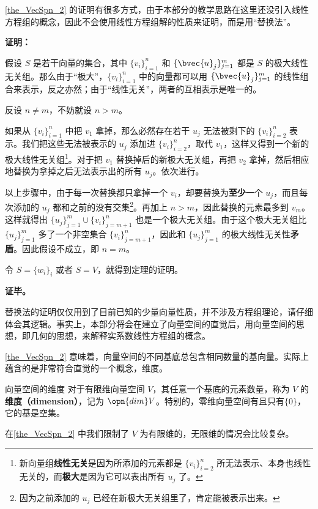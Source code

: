 \autoref{the_VecSpn_2} 的证明有很多方式，由于本部分的教学思路在这里还没引入线性方程组的概念，因此不会使用线性方程组解的性质来证明，而是用“替换法”。


\textbf{证明：}

假设 $S$ 是若干向量的集合，其中 $\{v_i\}_{i=1}^n$ 和 $\{\bvec{u}_j\}^m_{j=1}$ 都是 $S$ 的极大线性无关组。那么由于“极大”，$\{v_i\}_{i=1}^n$ 中的向量都可以用 $\{\bvec{u}_j\}^m_{j=1}$ 的线性组合来表示，反之亦然；由于“线性无关”，两者的互相表示是唯一的。

反设 $n\not=m$，不妨就设 $n>m$。

如果从 $\{v_i\}_{i=1}^n$ 中把 $v_1$ 拿掉，那么必然存在若干 $u_j$ 无法被剩下的 $\{v_i\}_{i=2}^n$ 表示。我们把这些无法被表示的 $u_j$ 添加进 $\{v_i\}_{i=2}^n$，取代 $v_1$，这样又得到一个新的极大线性无关组\footnote{新向量组\textbf{线性无关}是因为所添加的元素都是 $\{v_i\}_{i=2}^n$ 所无法表示、本身也线性无关的，而\textbf{极大}是因为它可以表出所有 $u_j$ 了。}。对于把 $v_1$ 替换掉后的新极大无关组，再把 $v_2$ 拿掉，然后相应地替换为拿掉之后无法表示出的所有 $u_j$。依次进行。

以上步骤中，由于每一次替换都只拿掉一个 $v_i$，却要替换为\textbf{至少}一个 $u_j$，而且每次添加的 $u_j$ 都和之前的没有交集\footnote{因为之前添加的 $u_j$ 已经在新极大无关组里了，肯定能被表示出来。}。再加上 $n>m$，因此替换的元素最多到 $v_m$。这样就得出 $\{u_j\}^m_{j=1} \cup \{v_i\}^n_{j=m+1}$ 也是一个极大无关组。由于这个极大无关组比 $\{u_j\}^m_{j=1}$ 多了一个非空集合 $\{v_i\}^n_{j=m+1}$，因此和 $\{u_j\}^m_{j=1}$ 的极大线性无关性\textbf{矛盾}。因此假设不成立，即 $n=m$。

令 $S=\{w_i\}_i$ 或者 $S=V$，就得到定理的证明。

\textbf{证毕。}

替换法的证明仅仅用到了目前已知的少量向量性质，并不涉及方程组理论，请仔细体会其逻辑。事实上，本部分将会在建立了向量空间的直觉后，用向量空间的思想，即几何的思想，来解释实系数线性方程组的概念。

\autoref{the_VecSpn_2} 意味着，向量空间的不同基底总包含相同数量的基向量。实际上蕴含的是非常符合直觉的一个概念，维度。

\begin{definition}{向量空间的维度}
对于有限维向量空间 $V$，其任意一个基底的元素数量，称为 $V$ 的\textbf{维度（dimension）}，记为 $\opn{dim} V$。特别的，零维向量空间有且只有$\{0\}$，它的基是空集。
\end{definition}

在\autoref{the_VecSpn_2} 中我们限制了 $V$ 为有限维的，无限维的情况会比较复杂。

